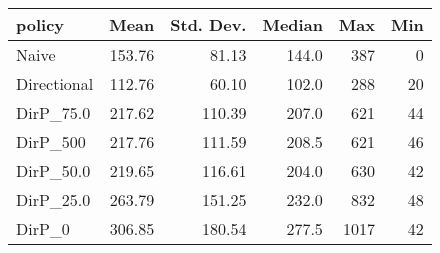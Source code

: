\begin{tabular}{lrrrrr}
\toprule
     policy &   Mean &  Std. Dev. &  Median &  Max &  Min \\
\midrule
      Naive & 153.76 &      81.13 &   144.0 &  387 &    0 \\
Directional & 112.76 &      60.10 &   102.0 &  288 &   20 \\
  DirP\_75.0 & 217.62 &     110.39 &   207.0 &  621 &   44 \\
   DirP\_500 & 217.76 &     111.59 &   208.5 &  621 &   46 \\
  DirP\_50.0 & 219.65 &     116.61 &   204.0 &  630 &   42 \\
  DirP\_25.0 & 263.79 &     151.25 &   232.0 &  832 &   48 \\
     DirP\_0 & 306.85 &     180.54 &   277.5 & 1017 &   42 \\
\bottomrule
\end{tabular}

